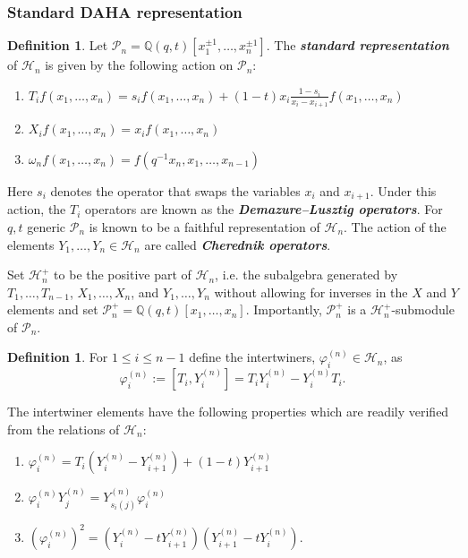 \documentclass[11pt]{article}
\theoremstyle{definition}
\newtheorem{defi}[theo]{Definition}
\numberwithin{equation}{section}
\begin{document}
\subsubsection{Standard DAHA representation}
\begin{defi} \label{defn2}
Let $\mathscr{P}_n = \mathbb{Q}(q,t)[x_1^{\pm 1},\ldots,x_n^{\pm 1}]$. The \textbf{\textit{ standard representation}} of $\mathscr{H}_n$ is given by the following action on $\mathscr{P}_n$:

\begin{center}
\begin{enumerate}
    \item $T_if(x_1,\ldots,x_n) = s_i f(x_1,\ldots,x_n) +(1-t)x_i \frac{1-s_i}{x_i-x_{i+1}}f(x_1,\ldots,x_n)$
    \item $X_if(x_1,\ldots,x_n)= x_if(x_1,\ldots,x_n)$
    \item $\omega_nf(x_1,\ldots,x_n) = f(q^{-1}x_n,x_1,\ldots,x_{n-1})$
\end{enumerate}
\end{center}

Here $s_i$ denotes the operator that swaps the variables $x_i$ and $x_{i+1}$. Under this action, the $T_i$ operators are known as the \textbf{\textit{Demazure--Lusztig operators}}. For $q,t$ generic $\mathscr{P}_n$ is known to be a faithful representation of $\mathscr{H}_n$. The action of the elements $Y_1,\ldots,Y_n \in \mathscr{H}_n$ are called \textbf{\textit{Cherednik operators}}.
\end{defi}

Set $\mathscr{H}_n^{+}$ to be the positive part of $\mathscr{H}_n$, i.e. the subalgebra generated by $T_1,\ldots,T_{n-1}$, $X_1,\ldots,X_n$, and $Y_1,\ldots,Y_n$ without allowing for inverses in the $X$ and $Y$ elements and set $\mathscr{P}_n^{+} = \mathbb{Q}(q,t)[x_1,\ldots,x_n]$. Importantly, 
$\mathscr{P}_n^{+}$ is a $\mathscr{H}_n^{+}$-submodule of $\mathscr{P}_n$. 

\begin{defi}
    For $1\leq i \leq n-1$ define the intertwiners, $\varphi_i^{(n)} \in \mathscr{H}_n$, as 
    $$\varphi_i^{(n)}:= [T_i,Y_i^{(n)}] = T_iY_i^{(n)} - Y_i^{(n)}T_i.$$
\end{defi}

The intertwiner elements have the following properties which are readily verified from the relations of $\mathscr{H}_{n}$: 
\begin{enumerate}
    \item $\varphi_i^{(n)} = T_i(Y_i^{(n)}-Y_{i+1}^{(n)}) + (1-t)Y_{i+1}^{(n)}$
    \item $\varphi_i^{(n)}Y_j^{(n)} = Y_{s_{i}(j)}^{(n)}\varphi_i^{(n)}$
    \item $(\varphi_i^{(n)})^2 = (Y_i^{(n)}-tY_{i+1}^{(n)})(Y_{i+1}^{(n)}-tY_i^{(n)}).$
\end{enumerate}
\end{document}
